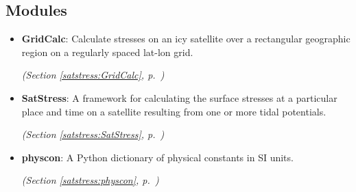 
\subsection{Modules}

\begin{itemize}
\setlength{\parskip}{0ex}
\item \textbf{GridCalc}: Calculate stresses on an icy satellite over a rectangular geographic region
on a regularly spaced lat-lon grid.



  \textit{(Section \ref{satstress:GridCalc}, p.~\pageref{satstress:GridCalc})}

\item \textbf{SatStress}: A framework for calculating the surface stresses at a particular place and 
time on a satellite resulting from one or more tidal potentials.



  \textit{(Section \ref{satstress:SatStress}, p.~\pageref{satstress:SatStress})}

\item \textbf{physcon}: A Python dictionary of physical constants in SI units.



  \textit{(Section \ref{satstress:physcon}, p.~\pageref{satstress:physcon})}

\end{itemize}

